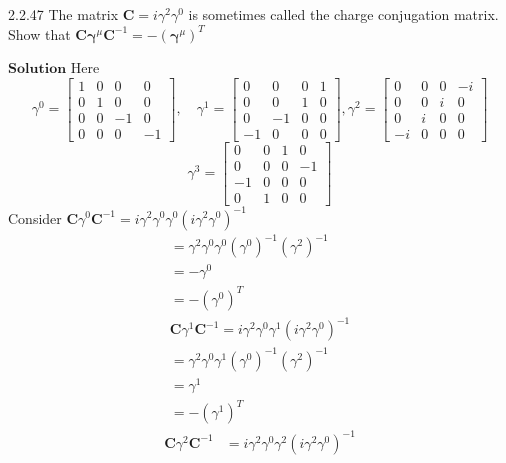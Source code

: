 \documentclass{article}
\begin{document}
\begin{flushleft}
\begin{mybox}{2.2.47}
The matrix $\mathbf{C}=i \gamma^{2} \gamma^{0}$ is sometimes called the charge conjugation matrix. Show that $\mathbf{C} \boldsymbol{\gamma}^{\mu} \mathbf{C}^{-1}=-\left(\boldsymbol{\gamma}^{\mu}\right)^{T}$
\end{mybox}
$\boxed{\textbf{Solution}}$ Here
$$
\gamma^{0}=\begin{bmatrix}
1 & 0 & 0 & 0 \\
0 & 1 & 0 & 0 \\
0 & 0 & -1 & 0 \\
0 & 0 & 0 & -1
\end{bmatrix}, \quad \gamma^{1}=\begin{bmatrix}
0 & 0 & 0 & 1 \\
0 & 0 & 1 & 0 \\
0 & -1 & 0 & 0 \\
-1 & 0 & 0 & 0
\end{bmatrix}, \gamma^{2}=\begin{bmatrix}
0 & 0 & 0 & -i \\
0 & 0 & i & 0 \\
0 & i & 0 & 0 \\
-i & 0 & 0 & 0
\end{bmatrix}
$$
$$
\gamma^{3}=\begin{bmatrix}
0 & 0 & 1 & 0 \\
0 & 0 & 0 & -1 \\
-1 & 0 & 0 & 0 \\
0 & 1 & 0 & 0
\end{bmatrix}
$$
Consider $\mathbf{C} \gamma^{0} \mathbf{C}^{-1}=i \gamma^{2} \gamma^{0} \gamma^{0}\left(i \gamma^{2} \gamma^{0}\right)^{-1}$
$$
\begin{array}{l}
=\gamma^{2} \gamma^{0} \gamma^{0}\left(\gamma^{0}\right)^{-1}\left(\gamma^{2}\right)^{-1} \\
=-\gamma^{0} \\
=-\left(\gamma^{0}\right)^{T} \\
\mathbf{C} \gamma^{1} \mathbf{C}^{-1}=i \gamma^{2} \gamma^{0} \gamma^{1}\left(i \gamma^{2} \gamma^{0}\right)^{-1} \\
=\gamma^{2} \gamma^{0} \gamma^{1}\left(\gamma^{0}\right)^{-1}\left(\gamma^{2}\right)^{-1} \\
=\gamma^{1} \\
=-\left(\gamma^{1}\right)^{T}
\end{array}
$$
$$
\begin{aligned}
\mathbf{C} \gamma^{2} \mathbf{C}^{-1} &=i \gamma^{2} \gamma^{0} \gamma^{2}\left(i \gamma^{2} \gamma^{0}\right)^{-1} \\

\end{aligned}$$
\end{flushleft}
\end{document}
